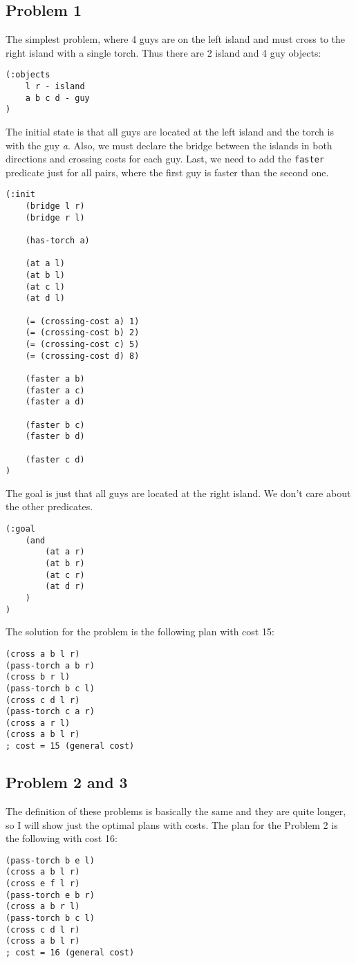 \documentclass[a4paper,11pt]{article}
\begin{document}
\subsection*{Problem 1}
The simplest problem, where 4 guys are on the left island and must cross to the right island with a single torch.
Thus there are 2 island and 4 guy objects:
\begin{verbatim}
(:objects
    l r - island
    a b c d - guy
)
\end{verbatim}
The initial state is that all guys are located at the left island and the torch is with the guy \textit{a}.
Also, we must declare the bridge between the islands in both directions and crossing costs for each guy.
Last, we need to add the \texttt{faster} predicate just for all pairs, where the first guy is faster than the second one.
\begin{verbatim}
(:init
    (bridge l r)
    (bridge r l)

    (has-torch a)

    (at a l)
    (at b l)
    (at c l)
    (at d l)

    (= (crossing-cost a) 1)
    (= (crossing-cost b) 2)
    (= (crossing-cost c) 5)
    (= (crossing-cost d) 8)

    (faster a b)
    (faster a c)
    (faster a d)

    (faster b c)
    (faster b d)

    (faster c d)
)
\end{verbatim}
The goal is just that all guys are located at the right island.
We don't care about the other predicates.
\begin{verbatim}
(:goal
    (and
        (at a r)
        (at b r)
        (at c r)
        (at d r)
    )
)
\end{verbatim}
The solution for the problem is the following plan with cost 15:
\begin{verbatim}
(cross a b l r)
(pass-torch a b r)
(cross b r l)
(pass-torch b c l)
(cross c d l r)
(pass-torch c a r)
(cross a r l)
(cross a b l r)
; cost = 15 (general cost)
\end{verbatim}

\subsection*{Problem 2 and 3}
The definition of these problems is basically the same and they are quite longer, so I will show just the optimal plans with costs.
The plan for the Problem 2 is the following with cost 16:
\begin{verbatim}
(pass-torch b e l)
(cross a b l r)
(cross e f l r)
(pass-torch e b r)
(cross a b r l)
(pass-torch b c l)
(cross c d l r)
(cross a b l r)
; cost = 16 (general cost)
\end{verbatim}
\end{document}
